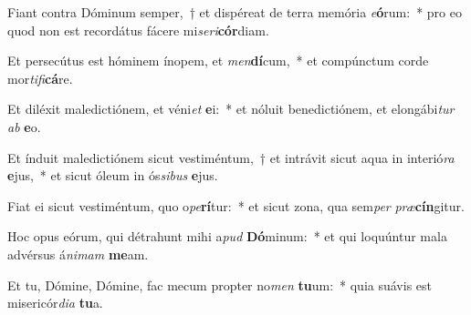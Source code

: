 \item Fiant contra Dóminum semper,~† et dispéreat de terra memória \textit{e}\textbf{ó}rum:~* pro eo quod non est recordátus fácere mi\textit{se}\textit{ri}\textbf{cór}diam.
\item Et persecútus est hóminem ínopem, et \textit{men}\textbf{dí}cum,~* et compúnctum corde mor\textit{ti}\textit{fi}\textbf{cá}re.
\item Et diléxit maledictiónem, et véni\textit{et} \textbf{e}i:~* et nóluit benedictiónem, et elongábi\textit{tur} \textit{ab} \textbf{e}o.
\item Et índuit maledictiónem sicut vestiméntum,~† et intrávit sicut aqua in interió\textit{ra} \textbf{e}jus,~* et sicut óleum in ós\textit{si}\textit{bus} \textbf{e}jus.
\item Fiat ei sicut vestiméntum, quo o\textit{pe}\textbf{rí}tur:~* et sicut zona, qua sem\textit{per} \textit{præ}\textbf{cín}gitur.
\item Hoc opus eórum, qui détrahunt mihi a\textit{pud} \textbf{Dó}minum:~* et qui loquúntur mala advérsus á\textit{ni}\textit{mam} \textbf{me}am.
\item Et tu, Dómine, Dómine, fac mecum propter no\textit{men} \textbf{tu}um:~* quia suávis est misericór\textit{di}\textit{a} \textbf{tu}a.
